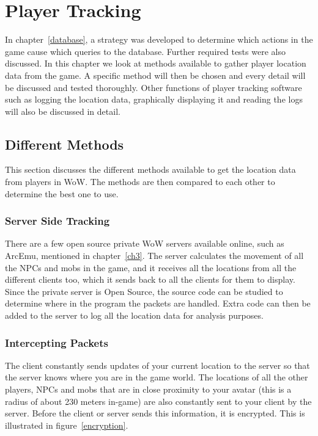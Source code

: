 \chapter{Player Tracking}
\label{ch5}

In chapter~\ref{database}, a strategy was developed to determine which actions in the game cause which queries to the database. Further required tests were also discussed. 
In this chapter we look at methods available to gather player location data from the game. A specific method will then be chosen and every detail will be discussed and tested thoroughly. Other functions of player tracking software such as logging the location data, graphically displaying it and reading the logs will also be discussed in detail. 

\section{Different Methods}
This section discusses the different methods available to get the location data from players in WoW. The methods are then compared to each other to determine the best one to use.

\subsection{Server Side Tracking}
There are a few open source private WoW servers available online, such as ArcEmu, mentioned in chapter~\ref{ch3}. The server calculates the movement of all the NPCs and mobs in the game, and it receives all the locations from all the different clients too, which it sends back to all the clients for them to display. Since the private server is Open Source, the source code can be studied to determine where in the program the packets are handled. Extra code can then be added to the server to log all the location data for analysis purposes. 


\subsection{Intercepting Packets}
The client constantly sends updates of your current location to the server so that the server knows where you are in the game world. The locations of all the other players, NPCs and mobs that are in close proximity to your avatar (this is a radius of about 230 meters in-game) are also constantly sent to your client by the server. Before the client or server sends this information, it is encrypted. This is illustrated in figure~\ref{encryption}.

